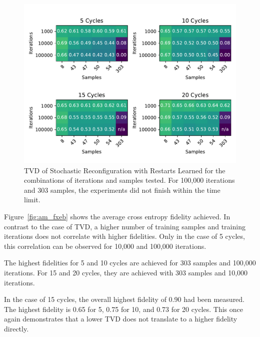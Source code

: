\begin{figure}[H]
  \centering
  \includegraphics[width=\textwidth]{figures/results/AM-restarts-learned/tvd_heatmap.pdf}
  \caption[TVD of AdaMax with Restarts Learned]{TVD of Stochastic 
  Reconfiguration with Restarts Learned for the combinations of iterations and samples tested.
  For 100,000 iterations and 303 samples, the experiments did not finish within the time limit.}
  \label{fig:am_tvd}
\end{figure}

Figure~\ref{fig:am_fxeb} shows the average cross entropy fidelity achieved. In contrast to the case 
of TVD, a higher number of training samples and training iterations does not correlate with higher 
fidelities. Only in the case of 5 cycles, this correlation can be observed for 10,000 and 100,000 iterations.

The highest fidelities for 5 and 10 cycles are achieved for 303 samples and 100,000 iterations. For 
15 and 20 cycles, they are achieved with 303 samples and 10,000 iterations. 

In the case of 15 cycles, the overall highest fidelity of 0.90 had been measured. The highest fidelity is 0.65 for 5, 0.75 for 10, and 0.73 for 20 cycles.
This once again demonstrates that a lower TVD does not translate to a higher fidelity directly.

